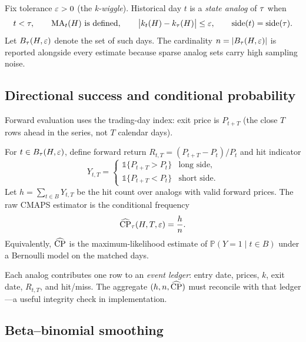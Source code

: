 Fix tolerance $\varepsilon > 0$ (the \emph{k-wiggle}).
Historical day $t$ is a \emph{state analog} of $\tau$ when
\begin{equation}
  t < \tau,
  \qquad
  \mathrm{MA}_t(H) \text{ is defined},
  \qquad
  \bigl|k_t(H) - k_{\tau}(H)\bigr| \le \varepsilon,
  \qquad
  \text{side}(t) = \text{side}(\tau).
  \label{eq:match}
\end{equation}
Let $B_{\tau}(H,\varepsilon)$ denote the set of such days.
The cardinality $n = |B_{\tau}(H,\varepsilon)|$ is reported alongside every estimate because sparse analog sets carry high sampling noise.

\subsection{Directional success and conditional probability}

Forward evaluation uses the trading-day index: exit price is $P_{t+T}$ (the close $T$ rows ahead in the series, not $T$ calendar days).

For $t \in B_{\tau}(H,\varepsilon)$, define forward return $R_{t,T} = (P_{t+T}-P_t)/P_t$ and hit indicator
\begin{equation}
  Y_{t,T} =
  \begin{cases}
    \mathbb{1}\{P_{t+T} > P_t\} & \text{long side},\\[0.2em]
    \mathbb{1}\{P_{t+T} < P_t\} & \text{short side}.
  \end{cases}
  \label{eq:hit}
\end{equation}
Let $h = \sum_{t \in B} Y_{t,T}$ be the hit count over analogs with valid forward prices.
The raw CMAPS estimator is the conditional frequency
\begin{equation}
  \widehat{\mathrm{CP}}_{\tau}(H,T,\varepsilon) = \frac{h}{n}.
  \label{eq:cp}
\end{equation}
Equivalently, $\widehat{\mathrm{CP}}$ is the maximum-likelihood estimate of $\mathbb{P}(Y=1 \mid t \in B)$ under a Bernoulli model on the matched days.

Each analog contributes one row to an \emph{event ledger}: entry date, prices, $k$, exit date, $R_{t,T}$, and hit/miss.
The aggregate $(h,n,\widehat{\mathrm{CP}})$ must reconcile with that ledger---a useful integrity check in implementation.

\subsection{Beta--binomial smoothing}

